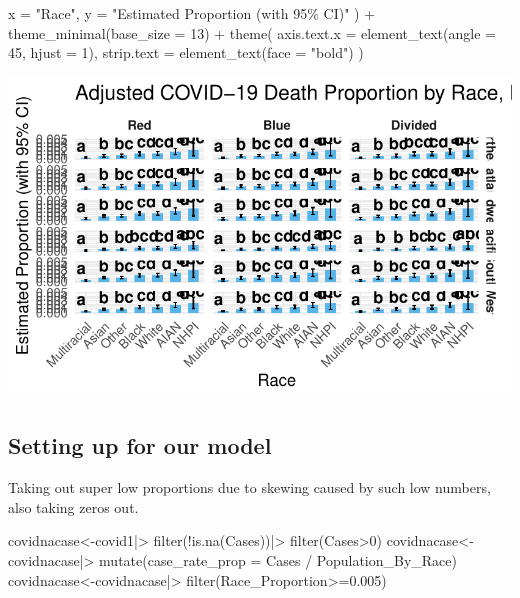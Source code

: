 \documentclass[
  letterpaper,
  DIV=11,
  numbers=noendperiod]{scrartcl}
\newenvironment{Shaded}{\begin{snugshade}}{\end{snugshade}}
\newcommand{\AttributeTok}[1]{\textcolor[rgb]{0.40,0.45,0.13}{#1}}
\newcommand{\DecValTok}[1]{\textcolor[rgb]{0.68,0.00,0.00}{#1}}
\newcommand{\FloatTok}[1]{\textcolor[rgb]{0.68,0.00,0.00}{#1}}
\newcommand{\FunctionTok}[1]{\textcolor[rgb]{0.28,0.35,0.67}{#1}}
\newcommand{\NormalTok}[1]{\textcolor[rgb]{0.00,0.23,0.31}{#1}}
\newcommand{\OtherTok}[1]{\textcolor[rgb]{0.00,0.23,0.31}{#1}}
\newcommand{\SpecialCharTok}[1]{\textcolor[rgb]{0.37,0.37,0.37}{#1}}
\newcommand{\StringTok}[1]{\textcolor[rgb]{0.13,0.47,0.30}{#1}}
\begin{document}
\begin{Shaded}
\begin{Highlighting}[]
    \AttributeTok{x =} \StringTok{"Race"}\NormalTok{,}
    \AttributeTok{y =} \StringTok{"Estimated Proportion (with 95\% CI)"}
\NormalTok{  ) }\SpecialCharTok{+}
  \FunctionTok{theme\_minimal}\NormalTok{(}\AttributeTok{base\_size =} \DecValTok{13}\NormalTok{) }\SpecialCharTok{+}
  \FunctionTok{theme}\NormalTok{(}
    \AttributeTok{axis.text.x =} \FunctionTok{element\_text}\NormalTok{(}\AttributeTok{angle =} \DecValTok{45}\NormalTok{, }\AttributeTok{hjust =} \DecValTok{1}\NormalTok{),}
    \AttributeTok{strip.text =} \FunctionTok{element\_text}\NormalTok{(}\AttributeTok{face =} \StringTok{"bold"}\NormalTok{)}
\NormalTok{  )}
\end{Highlighting}
\end{Shaded}

\includegraphics{StatsForFinalCSV_files/figure-pdf/unnamed-chunk-10-1.pdf}

\subsection{Setting up for our model}\label{setting-up-for-our-model-1}

Taking out super low proportions due to skewing caused by such low
numbers, also taking zeros out.

\begin{Shaded}
\begin{Highlighting}[]
\NormalTok{covidnacase}\OtherTok{\textless{}{-}}\NormalTok{covid1}\SpecialCharTok{|\textgreater{}}
  \FunctionTok{filter}\NormalTok{(}\SpecialCharTok{!}\FunctionTok{is.na}\NormalTok{(Cases))}\SpecialCharTok{|\textgreater{}}
  \FunctionTok{filter}\NormalTok{(Cases}\SpecialCharTok{\textgreater{}}\DecValTok{0}\NormalTok{)}
\NormalTok{covidnacase}\OtherTok{\textless{}{-}}\NormalTok{covidnacase}\SpecialCharTok{|\textgreater{}}
  \FunctionTok{mutate}\NormalTok{(}\AttributeTok{case\_rate\_prop =}\NormalTok{ Cases }\SpecialCharTok{/}\NormalTok{ Population\_By\_Race)}
\NormalTok{covidnacase}\OtherTok{\textless{}{-}}\NormalTok{covidnacase}\SpecialCharTok{|\textgreater{}}
  \FunctionTok{filter}\NormalTok{(Race\_Proportion}\SpecialCharTok{\textgreater{}=}\FloatTok{0.005}\NormalTok{)}
\end{Highlighting}
\end{Shaded}
\end{document}
